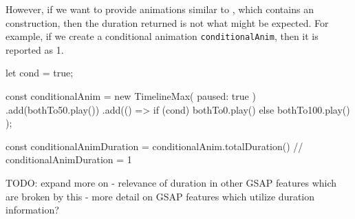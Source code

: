 However, if we want to provide animations similar to , which contains an  construction, then the duration returned is not what might be expected. For example, if we create a conditional animation \texttt{conditionalAnim}, then it is reported as 1.

\begin{js}
let cond = true;

const conditionalAnim = new TimelineMax({ paused: true })
  .add(bothTo50.play())
  .add(() => { if (cond) { bothTo0.play() } else { bothTo100.play() } });

const conditionalAnimDuration = conditionalAnim.totalDuration()
// conditionalAnimDuration = 1
\end{js}

TODO: expand more on - relevance of duration in other GSAP features which are broken by this - more detail on GSAP features which utilize duration information?
